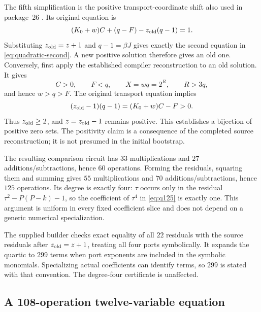The fifth simplification is the positive transport-coordinate shift also
used in package~26 \cite{repo26}.  Its original equation is
\[
 (K_0+w)C+(q-F)-z_{\rm old}(q-1)=1.
\]
Substituting $z_{\rm old}=z+1$ and $q-1=\beta J$ gives exactly the second
equation in \eqref{eq:quadratic-second}.  A new positive solution therefore
gives an old one.  Conversely, first apply the established compiler
reconstruction to an old solution.  It gives
\[
 C>0,\qquad F<q,\qquad X=wq=2^R,\qquad R>3q,
\]
and hence $w>q>F$.  The original transport equation implies
\[
 (z_{\rm old}-1)(q-1)=(K_0+w)C-F>0.
\]
Thus $z_{\rm old}\ge2$, and $z=z_{\rm old}-1$ remains positive.  This
establishes a bijection of positive zero sets.  The positivity claim is a
consequence of the completed source reconstruction; it is not presumed in
the initial bootstrap.

The resulting comparison circuit has $33$ multiplications and $27$
additions/subtractions, hence $60$ operations.  Forming the residuals,
squaring them and summing gives $55$ multiplications and $70$
additions/subtractions, hence $125$ operations.  Its degree is exactly
four: $\tau$ occurs only in the residual
$\tau^2-P(P-k)-1$, so the coefficient of $\tau^4$ in \eqref{eq:q125}
is exactly one.  This argument is uniform in every fixed coefficient
slice and does not depend on a generic numerical specialization.

The supplied builder checks exact equality of all $22$ residuals with
the source residuals after $z_{\rm old}=z+1$, treating all four ports
symbolically.  It expands the quartic to $299$ terms when port exponents
are included in the symbolic monomials.  Specializing actual coefficients
can identify terms, so $299$ is stated with that convention.  The
degree-four certificate is unaffected.

\subsection{A 108-operation twelve-variable equation}

